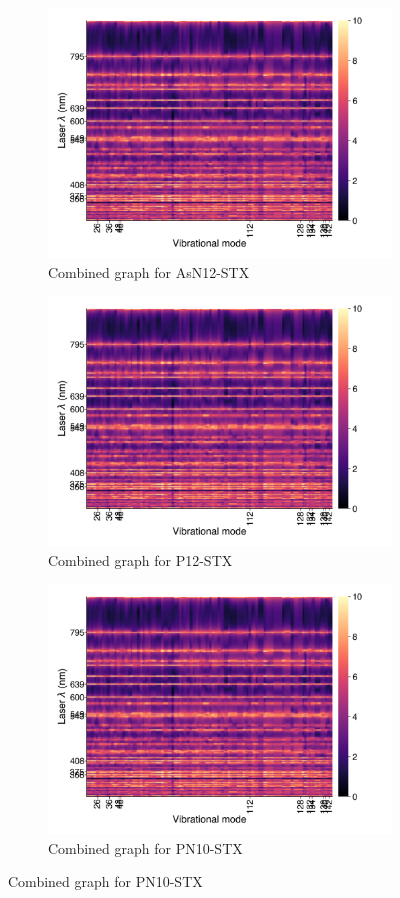 \documentclass[
	fontsize=10pt, %
	twoside=true, %
	numbers=noenddot, %
]{kaobook}
\begin{document}
\begin{figure}[h]
\centering
\begin{subfigure}{8.25cm}\centering\includegraphics{comb-as12}\caption{Combined graph for AsN12-STX}\end{subfigure}%
\begin{subfigure}{8.25cm}\centering\includegraphics{comb-as12}\caption{Combined graph for P12-STX}\end{subfigure}
\begin{subfigure}{8.25cm}\centering\includegraphics{comb-as12}\caption{Combined graph for PN10-STX}\end{subfigure}%

\end{figure}
\end{document}
